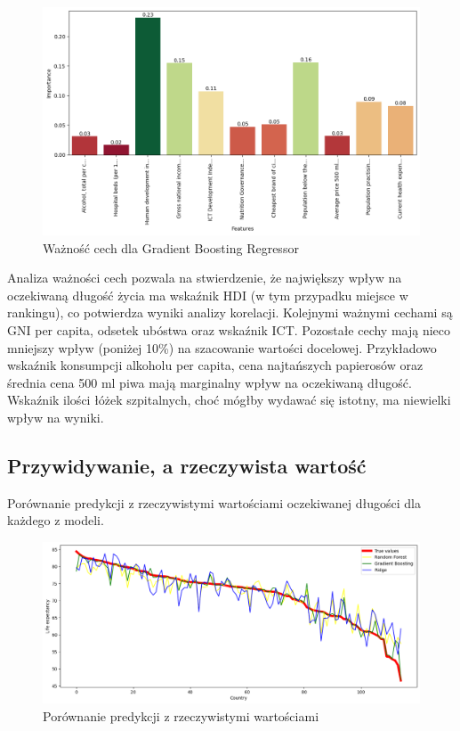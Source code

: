 \documentclass{article}
\begin{document}
\begin{figure}[H]
    \label{fig:feature_importance}
    \includegraphics[width=\textwidth]{graphs/features_importance.png}
    \caption{Ważność cech dla Gradient Boosting Regressor}
    \centering
\end{figure}

Analiza ważności cech pozwala na stwierdzenie, że największy wpływ na oczekiwaną długość życia ma wskaźnik HDI (w tym przypadku miejsce w rankingu), co potwierdza wyniki analizy korelacji.
Kolejnymi ważnymi cechami są GNI per capita, odsetek ubóstwa oraz wskaźnik ICT. Pozostałe cechy mają nieco mniejszy wpływ (poniżej 10\%) na
szacowanie wartości docelowej. Przykładowo wskaźnik konsumpcji alkoholu per capita, cena najtańszych papierosów oraz
średnia cena 500 ml piwa mają marginalny wpływ na oczekiwaną długość. Wskaźnik ilości łóżek szpitalnych, choć mógłby wydawać 
się istotny, ma niewielki wpływ na wyniki.

\subsection{Przywidywanie, a rzeczywista wartość}

Porównanie predykcji z rzeczywistymi wartościami oczekiwanej długości dla każdego z modeli.

\begin{figure}[H]
    \label{fig:predictions_vs_real}
    \includegraphics[width=\textwidth]{graphs/true_prediction.png}
    \caption{Porównanie predykcji z rzeczywistymi wartościami}
    \centering
\end{figure}
\end{document}
